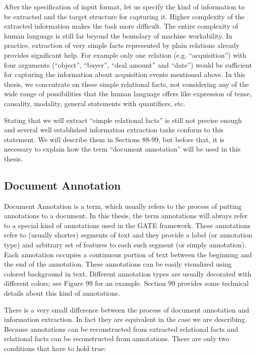 After the specification of input format, let us specify the kind of information to be extracted and the target structure for capturing it. Higher complexity of the extracted information makes the task more difficult. The entire complexity of human language is still far beyond the boundary of machine workability. In practice, extraction of very simple facts represented by plain relations already provides significant help. For example only one relation (e.g. “acquisition”) with four arguments (“object”, “buyer”, “deal amount” and “date”) would be sufficient for capturing the information about acquisition events mentioned above. In this thesis, we concentrate on these simple relational facts, not considering any of the wide range of possibilities that the human language offers like expression of tense, causality, modality, general statements with quantifiers, etc.



Stating that we will extract “simple relational facts” is still not precise enough and several well established information extraction tasks conform to this statement. We will describe them in Sections 88-99, but before that, it is necessary to explain how the term “document annotation” will be used in this thesis.

\subsection{Document Annotation}

Document Annotation is a term, which usually refers to the process of putting annotations to a document. In this thesis, the term annotations will always refer to a special kind of annotations used in the GATE framework.  These annotations refer to (usually shorter) segments of text and they provide a label (or annotation type) and arbitrary set of features to each such segment (or simply annotation). Each annotation occupies a continuous portion of text between the beginning and the end of the annotation. These annotations can be easily visualized using colored background in text. Different annotation types are usually decorated with different colors; see Figure 99 for an example. Section 99 provides some technical details about this kind of annotations.

There is a very small difference between the process of document annotation and information extraction. In fact they are equivalent in the case we are describing. Because annotations can be reconstructed from extracted relational facts and relational facts can be reconstructed from annotations. There are only two conditions that have to hold true:

